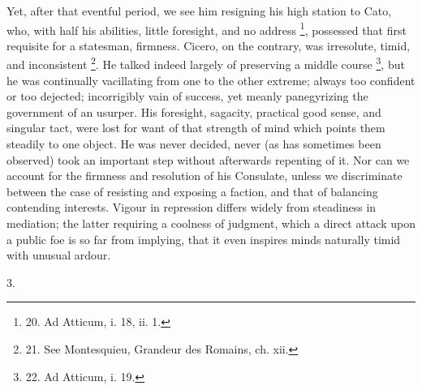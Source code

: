 Yet, after that eventful
period, we see him resigning his high station to Cato, who, with half
his abilities, little foresight, and no address \footnote{20. Ad Atticum, i. 18, ii. 1.}, possessed that first requisite for a statesman, firmness.
Cicero, on the contrary, was irresolute, timid, and inconsistent \footnote{21. See Montesquieu, Grandeur
des Romains, ch. xii.}. He talked indeed largely of preserving a middle course \footnote{22. Ad
Atticum, i. 19.}, but he was continually vacillating from one to the other
extreme; always too confident or too dejected; incorrigibly vain of
success, yet meanly panegyrizing the government of an usurper. His
foresight, sagacity, practical good sense, and singular tact, were
lost for want of that strength of mind which points them steadily to
one object. He was never decided, never (as has sometimes been
observed) took an important step without afterwards repenting of it.
Nor can we account for the firmness and resolution of his
Consulate, unless we discriminate between the case of resisting and
exposing a faction, and that of balancing contending interests. Vigour
in repression differs widely from steadiness in mediation; the latter
requiring a coolness of judgment, which a direct attack upon a public
foe is so far from implying, that it even inspires minds naturally
timid with unusual ardour.

3.

